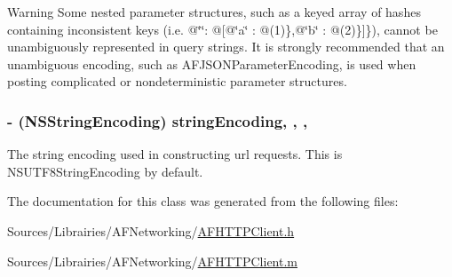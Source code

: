 \begin{DoxyWarning}{Warning}
Some nested parameter structures, such as a keyed array of hashes containing inconsistent keys (i.\-e. {\ttfamily @\char`\"{}\char`\"{}\-: @\mbox{[}@\char`\"{}a\char`\"{} \-: @(1)\},@\char`\"{}b\char`\"{} \-: @(2)\}\mbox{]}\}}), cannot be unambiguously represented in query strings. It is strongly recommended that an unambiguous encoding, such as {\ttfamily A\-F\-J\-S\-O\-N\-Parameter\-Encoding}, is used when posting complicated or nondeterministic parameter structures. 
\end{DoxyWarning}
\hypertarget{interface_a_f_h_t_t_p_client_a77951c40c6ec24f1c041544a105245c8}{
\subsubsection[{string\-Encoding}]{\setlength{\rightskip}{0pt plus 5cm}-\/ (N\-S\-String\-Encoding) string\-Encoding\hspace{0.3cm}{\ttfamily [read]}, {\ttfamily [write]}, {\ttfamily [nonatomic]}, {\ttfamily [assign]}}}\label{interface_a_f_h_t_t_p_client_a77951c40c6ec24f1c041544a105245c8}
The string encoding used in constructing url requests. This is {\ttfamily N\-S\-U\-T\-F8\-String\-Encoding} by default. 

The documentation for this class was generated from the following files\-:\begin{DoxyCompactItemize}
\item 
Sources/\-Librairies/\-A\-F\-Networking/\hyperlink{_a_f_h_t_t_p_client_8h}{A\-F\-H\-T\-T\-P\-Client.\-h}\item 
Sources/\-Librairies/\-A\-F\-Networking/\hyperlink{_a_f_h_t_t_p_client_8m}{A\-F\-H\-T\-T\-P\-Client.\-m}\end{DoxyCompactItemize}
